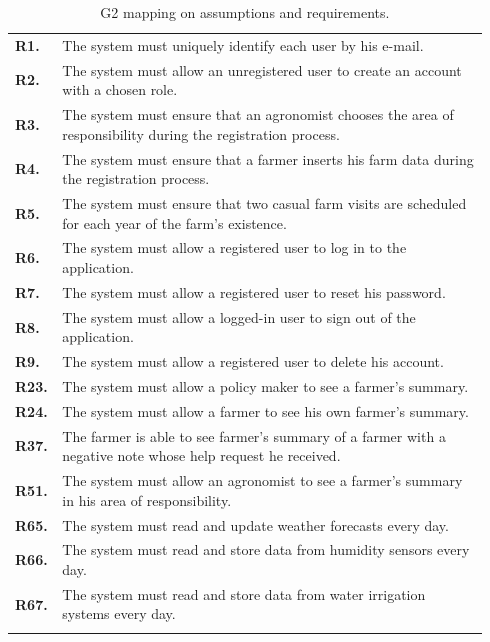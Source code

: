 \begin{longtable}{p{0.06\linewidth} p{0.88\linewidth}}
    \midrule
	\textbf{R1.} & The system must uniquely identify each user by his e-mail. \\
	\textbf{R2.} & The system must allow an unregistered user to create an account with a chosen role. \\
	\textbf{R3.} & The system must ensure that an agronomist chooses the area of responsibility during the registration process. \\
	\textbf{R4.} & The system must ensure that a farmer inserts his farm data during the registration process.\\
	\textbf{R5.} & The system must ensure that two casual farm visits are scheduled for each year of the farm's existence.\\
	\textbf{R6.} & The system must allow a registered user to log in to the application. \\
	\textbf{R7.} & The system must allow a registered user to reset his password. \\
	\textbf{R8.} & The system must allow a logged-in user to sign out of the application. \\
	\textbf{R9.} & The system must allow a registered user to delete his account. \\
	
	\textbf{R23.} & The system must allow a policy maker to see a farmer's summary.\\
	
	\textbf{R24.} & The system must allow a farmer to see his own farmer's summary.\\
	\textbf{R37.} & The farmer is able to see farmer's summary of a farmer with a negative note whose help request he received. \\

	\textbf{R51.} & The system must allow an agronomist to see a farmer's summary in his area of responsibility.\\

	\textbf{R65.} & The system must read and update weather forecasts every day. \\
	\textbf{R66.} & The system must read and store data from humidity sensors every day. \\
	\textbf{R67.} & The system must read and store data from water irrigation systems every day. \\
    \bottomrule
    \caption{G2 mapping on assumptions and requirements.}
\end{longtable}

